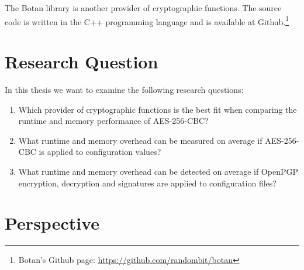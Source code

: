 The Botan library is another provider of cryptographic functions.
The source code is written in the C++ programming language and is available at Github.\footnote{Botan's Github page: \url{https://github.com/randombit/botan}}

\section{Research Question}
\label{researchq}

In this thesis we want to examine the following research questions:

\begin{enumerate}
  \item Which provider of cryptographic functions is the best fit when comparing the runtime and memory performance of AES-256-CBC?
  \item What runtime and memory overhead can be measured on average if AES-256-CBC is applied to configuration values?
  \item What runtime and memory overhead can be detected on average if OpenPGP encryption, decryption and signatures are applied to configuration files?
\end{enumerate}

\section{Perspective}

